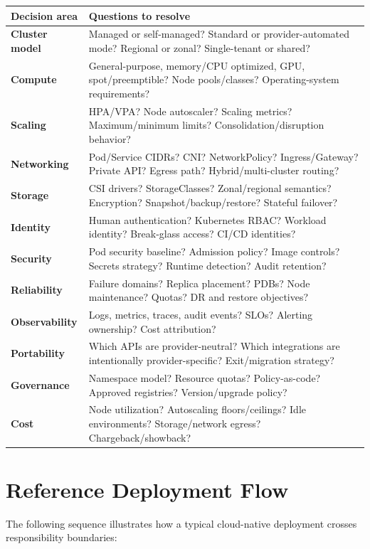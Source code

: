 \documentclass[11pt]{article}
\begin{document}
\begin{longtable}{>{\bfseries}p{3.2cm} p{11.8cm}}
\toprule
Decision area & Questions to resolve \\
\midrule
\endhead
Cluster model & Managed or self-managed? Standard or provider-automated mode? Regional or zonal? Single-tenant or shared? \\
Compute & General-purpose, memory/CPU optimized, GPU, spot/preemptible? Node pools/classes? Operating-system requirements? \\
Scaling & HPA/VPA? Node autoscaler? Scaling metrics? Maximum/minimum limits? Consolidation/disruption behavior? \\
Networking & Pod/Service CIDRs? CNI? NetworkPolicy? Ingress/Gateway? Private API? Egress path? Hybrid/multi-cluster routing? \\
Storage & CSI drivers? StorageClasses? Zonal/regional semantics? Encryption? Snapshot/backup/restore? Stateful failover? \\
Identity & Human authentication? Kubernetes RBAC? Workload identity? Break-glass access? CI/CD identities? \\
Security & Pod security baseline? Admission policy? Image controls? Secrets strategy? Runtime detection? Audit retention? \\
Reliability & Failure domains? Replica placement? PDBs? Node maintenance? Quotas? DR and restore objectives? \\
Observability & Logs, metrics, traces, audit events? SLOs? Alerting ownership? Cost attribution? \\
Portability & Which APIs are provider-neutral? Which integrations are intentionally provider-specific? Exit/migration strategy? \\
Governance & Namespace model? Resource quotas? Policy-as-code? Approved registries? Version/upgrade policy? \\
Cost & Node utilization? Autoscaling floors/ceilings? Idle environments? Storage/network egress? Chargeback/showback? \\
\bottomrule
\end{longtable}

\section{Reference Deployment Flow}

The following sequence illustrates how a typical cloud-native deployment crosses responsibility boundaries:
\end{document}
